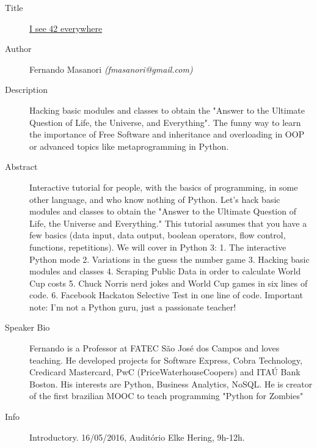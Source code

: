 \begin{description}
   \item[Title] \underline{I see 42 everywhere}
   \item[Author] Fernando Masanori \emph{(fmasanori@gmail.com)}
   \item[Description] Hacking basic modules and classes to obtain the "Answer to the Ultimate Question of Life, the Universe, and Everything". The funny way to learn the importance of Free Software and inheritance and overloading in OOP or advanced topics like metaprogramming in Python. 
   \item[Abstract] Interactive tutorial for people, with the basics of programming, in some other language, and who know nothing of Python. Let's hack basic modules and classes to obtain the "Answer to the Ultimate Question of Life, the Universe and Everything." This tutorial assumes that you have a few basics (data input, data output, boolean operators, flow control, functions, repetitions). We will cover in Python 3: 1. The interactive Python mode 2. Variations in the guess the number game 3. Hacking basic modules and classes 4. Scraping Public Data in order to calculate World Cup costs 5. Chuck Norris nerd jokes and World Cup games in six lines of code. 6. Facebook Hackaton Selective Test in one line of code. Important note: I'm not a Python guru, just a passionate teacher!
    \item[Speaker Bio] Fernando is a Professor at FATEC São José dos Campos and loves teaching. He developed projects for Software Express, Cobra Technology, Credicard Mastercard, PwC (PriceWaterhouseCoopers) and ITAÚ Bank Boston. His interests are Python, Business Analytics, NoSQL. He is creator of the first brazilian MOOC to teach programming "Python for Zombies"
    \item[Info] Introductory. 16/05/2016, Auditório Elke Hering, 9h-12h.
 \end{description} 
